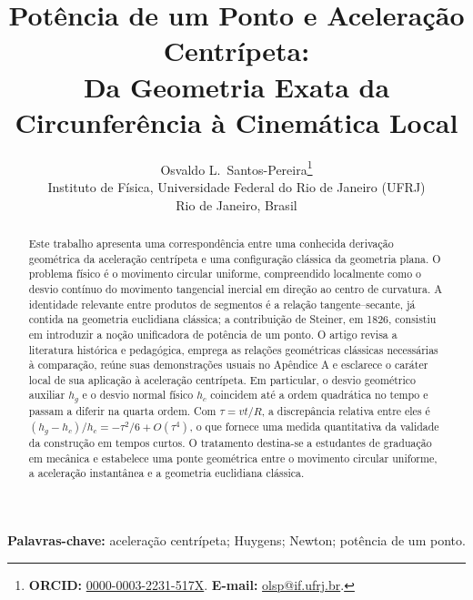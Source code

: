 \documentclass[12pt,a4paper]{article}
\numberwithin{equation}{section}
\theoremstyle{remark}
\begin{document}
\title{Potência de um Ponto e Aceleração Centrípeta:\\
\large Da Geometria Exata da Circunferência à Cinemática Local}
\author{Osvaldo L.\ Santos-Pereira\thanks{\textbf{ORCID:} \href{https://orcid.org/0000-0003-2231-517X}{0000-0003-2231-517X}. \textbf{E-mail:} \href{mailto:olsp@if.ufrj.br}{olsp@if.ufrj.br}.}\\
\small Instituto de Física, Universidade Federal do Rio de Janeiro (UFRJ)\\
\small Rio de Janeiro, Brasil}
\date{}
\maketitle
\begin{abstract}
Este trabalho apresenta uma correspondência entre uma conhecida derivação geométrica da aceleração centrípeta e uma configuração clássica da geometria plana. O problema físico é o movimento circular uniforme, compreendido localmente como o desvio contínuo do movimento tangencial inercial em direção ao centro de curvatura. A identidade relevante entre produtos de segmentos é a relação tangente--secante, já contida na geometria euclidiana clássica; a contribuição de Steiner, em 1826, consistiu em introduzir a noção unificadora de potência de um ponto. O artigo revisa a literatura histórica e pedagógica, emprega as relações geométricas clássicas necessárias à comparação, reúne suas demonstrações usuais no Apêndice A e esclarece o caráter local de sua aplicação à aceleração centrípeta. Em particular, o desvio geométrico auxiliar $h_g$ e o desvio normal físico $h_c$ coincidem até a ordem quadrática no tempo e passam a diferir na quarta ordem. Com $\tau=vt/R$, a discrepância relativa entre eles é $(h_g-h_c)/h_c=-\tau^2/6+O(\tau^4)$, o que fornece uma medida quantitativa da validade da construção em tempos curtos. O tratamento destina-se a estudantes de graduação em mecânica e estabelece uma ponte geométrica entre o movimento circular uniforme, a aceleração instantânea e a geometria euclidiana clássica.
\end{abstract}

\noindent\textbf{Palavras-chave:} aceleração centrípeta; Huygens; Newton; potência de um ponto.

\clearpage
\thispagestyle{plain}


{}
\end{document}
